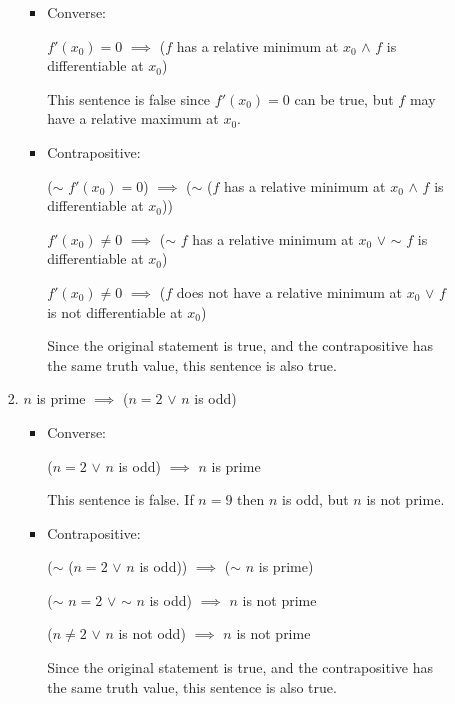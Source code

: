 \documentclass[12pt,letterpaper]{article}
\begin{document}
\begin{enumerate}
\begin{enumerate}
\begin{enumerate}
              \begin{itemize}
                \item Converse:

                  $f'(x_0) = 0$ $\implies$ ($f$ has a relative minimum at $x_0$ $\land$ $f$ is differentiable at $x_0$)

                  This sentence is false since $f'(x_0) = 0$ can be true, but $f$ may have a relative maximum at $x_0$.

                \item Contrapositive:

                  ($\sim$ $f'(x_0) = 0$) $\implies$ ($\sim$ ($f$ has a relative minimum at $x_0$ $\land$ $f$ is differentiable at $x_0$))

                  $f'(x_0) \neq 0$ $\implies$ ($\sim$ $f$ has a relative minimum at $x_0$ $\lor$ $\sim$ $f$ is differentiable at $x_0$)

                  $f'(x_0) \neq 0$ $\implies$ ($f$ does not have a relative minimum at $x_0$ $\lor$ $f$ is not differentiable at $x_0$)

                  Since the original statement is true,
                  and the contrapositive has the same truth value,
                  this sentence is also true.

              \end{itemize}

            \item
              $n$ is prime $\implies$ ($n = 2$ $\lor$ $n$ is odd)

              \begin{itemize}
                \item Converse:

                  ($n = 2$ $\lor$ $n$ is odd) $\implies$ $n$ is prime

                  This sentence is false.
                  If $n = 9$ then $n$ is odd, but $n$ is not prime.
                \item Contrapositive:

                  ($\sim$ ($n = 2$ $\lor$ $n$ is odd)) $\implies$ ($\sim$ $n$ is prime)

                  ($\sim$ $n = 2$ $\lor$ $\sim$ $n$ is odd) $\implies$ $n$ is not prime

                  ($n \neq 2$ $\lor$ $n$ is not odd) $\implies$ $n$ is not prime

                  Since the original statement is true,
                  and the contrapositive has the same truth value,
                  this sentence is also true.


\end{itemize}
\end{enumerate}
\end{enumerate}
\end{enumerate}
\end{document}

